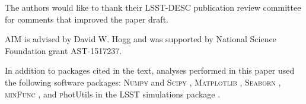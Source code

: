 \documentclass[\docopts]{\docclass}
\begin{document}


The authors would like to thank their LSST-DESC publication review committee for comments that improved the paper draft.

AIM is advised by David W. Hogg and was supported by National Science Foundation grant AST-1517237.

In addition to packages cited in the text, analyses performed in this paper used the following software packages: \textsc{Numpy} and \textsc{Scipy} \citep{numpyscipy}, \textsc{Matplotlib} \citep{matplotlib}, \textsc{Seaborn} \citep{seaborn}, \textsc{minFunc} \citep{minfunc}, and {\textsc photUtils} in the LSST simulations package \citep{lsstphotutils}.



%
%






\end{document}
